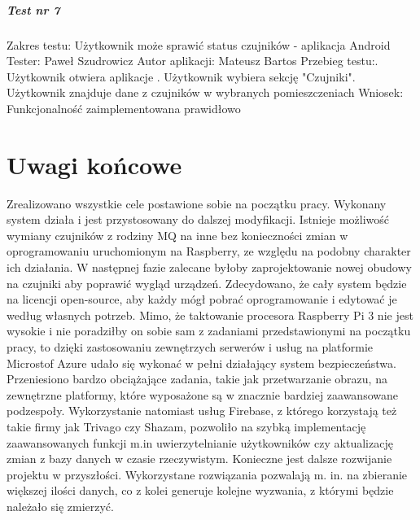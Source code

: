 \paragraph{Test nr 7}
Zakres testu:\newline
Użytkownik może sprawić status czujników - aplikacja Android\newline
Tester: Paweł Szudrowicz \newline
Autor aplikacji: Mateusz Bartos \newline
Przebieg testu:. Użytkownik otwiera aplikacje . Użytkownik wybiera sekcję "Czujniki". Użytkownik znajduje dane z czujników w wybranych pomieszczeniach\newline
Wniosek:\newline
Funkcjonalność zaimplementowana prawidłowo\newline
\newline

\chapter{Uwagi końcowe}

Zrealizowano wszystkie cele postawione sobie na początku pracy. Wykonany system działa i jest przystosowany do dalszej modyfikacji. Istnieje możliwość wymiany czujników z rodziny MQ na inne bez konieczności zmian w oprogramowaniu uruchomionym na Raspberry, ze względu na podobny charakter ich działania. W następnej fazie zalecane byłoby zaprojektowanie nowej obudowy na czujniki aby poprawić wygląd urządzeń. Zdecydowano, że cały system będzie na licencji open-source, aby każdy mógł pobrać oprogramowanie i edytować je według własnych potrzeb. Mimo, że taktowanie procesora Raspberry Pi 3 nie jest wysokie i nie poradziłby on sobie sam z zadaniami przedstawionymi na początku pracy, to dzięki zastosowaniu zewnętrzych serwerów i usług na platformie Microstof Azure udało się wykonać w pełni działający system bezpieczeństwa. Przeniesiono bardzo obciążające zadania, takie jak przetwarzanie obrazu, na zewnętrzne platformy, które wyposażone są w znacznie bardziej zaawansowane podzespoły. Wykorzystanie natomiast usług Firebase, z którego korzystają też takie firmy jak Trivago czy Shazam, pozwoliło na szybką implementację zaawansowanych funkcji m.in uwierzytelnianie użytkowników czy aktualizację zmian z bazy danych w czasie rzeczywistym. 
Konieczne jest dalsze rozwijanie projektu w przyszłości. Wykorzystane rozwiązania pozwalają m. in. na zbieranie większej ilości danych, co z kolei generuje kolejne wyzwania, z którymi będzie należało się zmierzyć.
